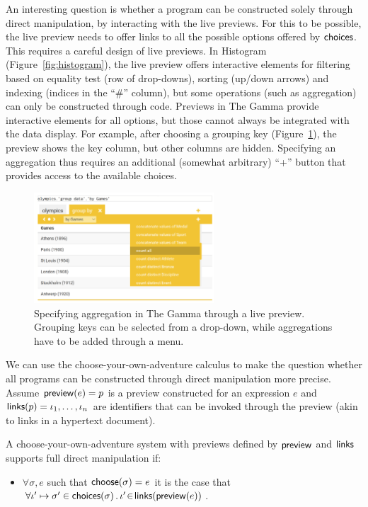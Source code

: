 \documentclass[a4paper,UKenglish,cleveref, autoref, thm-restate]{lipics-v2021}
\newcommand{\ident}[1]{\textsf{#1}}
\newcommand{\select}{\textnormal{\ident{choose}}}
\newcommand{\choices}{\textnormal{\ident{choices}}}
\newcommand{\preview}{\textnormal{\ident{preview}}}
\newcommand{\links}{\textnormal{\ident{links}}}
\begin{document}
An interesting question is whether a program can be constructed solely through direct manipulation,
by interacting with the live previews. For this to be possible, the live preview needs to
offer links to all the possible options offered by $\choices$. This requires a careful design
of live previews. In Histogram (Figure~\ref{fig:histogram}), the live preview offers interactive
elements for filtering based on equality test (row of drop-downs), sorting (up/down arrows)
and indexing (indices in the ``\#'' column), but some operations (such as aggregation) can only
be constructed through code. Previews in The Gamma provide interactive elements for all options,
but those cannot always be integrated with the data display. For example, after choosing a grouping
key (Figure~\ref{fig:groupby}), the preview shows the key column, but other columns are hidden.
Specifying an aggregation thus requires an additional (somewhat arbitrary) ``+'' button that
provides access to the available choices.

\begin{figure}[t]
\includegraphics[width=0.6\textwidth]{fig/thegamma3.png}
\caption{Specifying aggregation in The Gamma through a live preview. Grouping keys can be
  selected from a drop-down, while aggregations have to be added through a menu.}
\label{fig:groupby}
\end{figure}

We can use the choose-your-own-adventure calculus to make the question whether all
programs can be constructed through direct manipulation more precise. Assume
$\preview(e)=p$ is a preview constructed for an expression $e$ and $\links(p)=\iota_1, \ldots, \iota_n$
are identifiers that can be invoked through the preview (akin to links in a hypertext document).

\begin{definition}
A choose-your-own-adventure system with previews defined by $\preview$ and $\links$ supports
full direct manipulation if:
\begin{itemize}
\item $\forall \sigma, e$ such that $\select(\sigma)=e$ it is the case that
  $\forall \iota'\mapsto\sigma'\in\choices(\sigma)\,.\,\iota'\!\in\!\links(\preview(e))$.
\end{itemize}
\end{definition}
\end{document}
